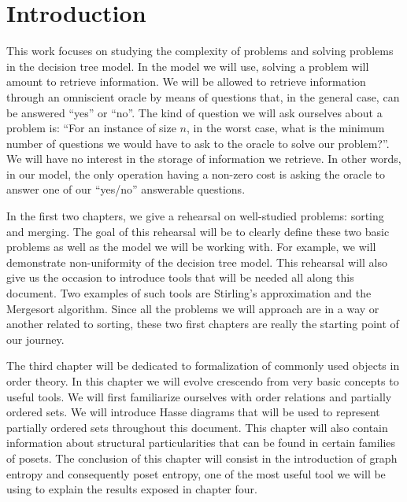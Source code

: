 \setcounter{chapter}{-1}
\chapter{Introduction}

This work focuses on studying the complexity of problems and solving problems
in the decision tree model. In the model we will use, solving a problem will
amount to retrieve information. We will be allowed to retrieve information
through an omniscient oracle by means of questions that, in the general case,
can be answered ``yes'' or ``no''. The kind of question we will ask ourselves
about a problem is: ``For an instance of size \(n\), in the worst case, what is
the minimum number of questions we would have to ask to the oracle to solve our
problem?''. We will have no interest in the storage of information we retrieve.
In other words, in our model, the only operation having a non-zero cost is
asking the oracle to answer one of our ``yes/no'' answerable questions.

In the first two chapters, we give a rehearsal on well-studied problems:
sorting and merging. The goal of this rehearsal will be to clearly define these
two basic problems as well as the model we will be working with. For example,
we will demonstrate non-uniformity of the decision tree model. This rehearsal
will also give us the occasion to introduce tools that will be needed all along
this document. Two examples of such tools are Stirling's approximation and the
Mergesort algorithm.  Since all the problems we will approach are in a way or
another related to sorting, these two first chapters are really the starting
point of our journey.

The third chapter will be dedicated to formalization of commonly used objects
in order theory. In this chapter we will evolve crescendo from very basic
concepts to useful tools. We will first familiarize ourselves with order
relations and partially ordered sets. We will introduce Hasse diagrams that
will be used to represent partially ordered sets throughout this document.
This chapter will also contain information about structural particularities
that can be found in certain families of posets. The conclusion of this
chapter will consist in the introduction of graph entropy and consequently
poset entropy, one of the most useful tool we will be using to explain the
results exposed in chapter four.

